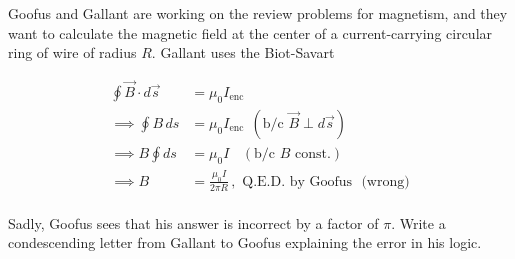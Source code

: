 
\begin{Exercise}
Goofus and Gallant are working on the review problems for magnetism, and they want to calculate the magnetic field at the center of a current-carrying circular ring of wire of radius $R$.  Gallant uses the Biot-Savart


\begin{align*}
\oint \vec{B} \cdot d\vec{s} &= \mu_0 I_\text{enc} \\
\implies \oint B \, ds &= \mu_0 I_\text{enc} ~~ (\text{b/c } \vec{B} \perp d\vec{s}) \\
\implies B \oint ds &=  \mu_0 I ~~~~ (\text{b/c } B \text{ const.}) \\
\implies B  &=  \frac {\mu_0 I}{2\pi R}\, , \text{ Q.E.D. by Goofus~~(wrong)} \\
\end{align*}

Sadly, Goofus sees that his answer is incorrect by a factor of $\pi$.  
Write a 
condescending letter from Gallant to Goofus explaining the error in his logic.
\end{Exercise}


